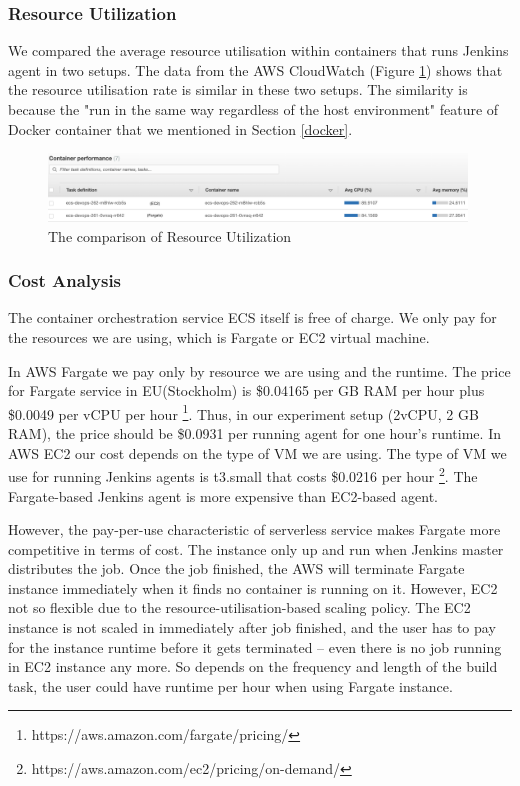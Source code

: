 \subsubsection{Resource Utilization}
We compared the average resource utilisation within containers that runs Jenkins agent in two setups. The data from the AWS CloudWatch (Figure \ref{fig:utilizationecs}) shows that the resource utilisation rate is similar in these two setups. The similarity is because the "run in the same way regardless of the host environment" \cite{WhatisaC60:online} feature of Docker container that we mentioned in Section \ref{docker}.
\begin{figure}[h]
\centering
\includegraphics[width=0.99\textwidth]{pics/utilizationecs.png}
\caption{The comparison of Resource Utilization}
\label{fig:utilizationecs}
\end{figure}
\subsubsection{Cost Analysis}
The container orchestration service ECS itself is free of charge. We only pay for the resources we are using, which is Fargate or EC2 virtual machine.
\par
In AWS Fargate we pay only by resource we are using and the runtime. The price for Fargate service in EU(Stockholm) is \$0.04165 per GB RAM per hour plus \$0.0049 per vCPU per hour \footnote{https://aws.amazon.com/fargate/pricing/}. Thus, in our experiment setup (2vCPU, 2 GB RAM), the price should be \$0.0931 per running agent for one hour's runtime.
In AWS EC2 our cost depends on the type of VM we are using. The type of VM we use for running Jenkins agents is t3.small that costs \$0.0216 per hour \footnote{https://aws.amazon.com/ec2/pricing/on-demand/}. The Fargate-based Jenkins agent is more expensive than EC2-based agent.
\par
However, the pay-per-use characteristic of serverless service makes Fargate more competitive in terms of cost. The instance only up and run when Jenkins master distributes the job. Once the job finished, the AWS will terminate Fargate instance immediately when it finds no container is running on it. However, EC2 not so flexible due to the resource-utilisation-based scaling policy. The EC2 instance is not scaled in immediately after job finished, and the user has to pay for the instance runtime before it gets terminated -- even there is no job running in EC2 instance any more. So depends on the frequency and length of the build task, the user could have runtime per hour when using Fargate instance.
